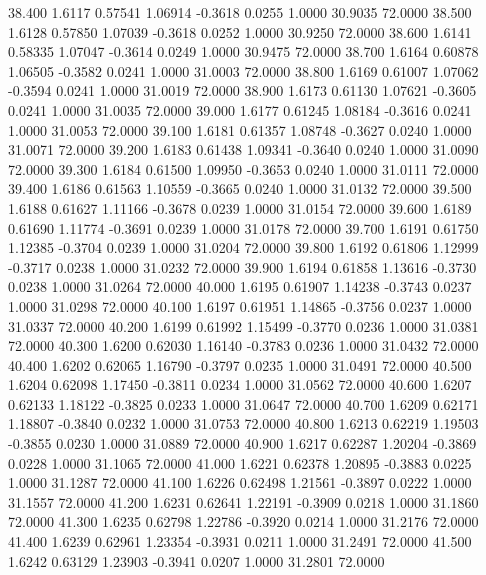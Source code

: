   38.400   1.6117   0.57541   1.06914  -0.3618   0.0255   1.0000  30.9035  72.0000
  38.500   1.6128   0.57850   1.07039  -0.3618   0.0252   1.0000  30.9250  72.0000
  38.600   1.6141   0.58335   1.07047  -0.3614   0.0249   1.0000  30.9475  72.0000
  38.700   1.6164   0.60878   1.06505  -0.3582   0.0241   1.0000  31.0003  72.0000
  38.800   1.6169   0.61007   1.07062  -0.3594   0.0241   1.0000  31.0019  72.0000
  38.900   1.6173   0.61130   1.07621  -0.3605   0.0241   1.0000  31.0035  72.0000
  39.000   1.6177   0.61245   1.08184  -0.3616   0.0241   1.0000  31.0053  72.0000
  39.100   1.6181   0.61357   1.08748  -0.3627   0.0240   1.0000  31.0071  72.0000
  39.200   1.6183   0.61438   1.09341  -0.3640   0.0240   1.0000  31.0090  72.0000
  39.300   1.6184   0.61500   1.09950  -0.3653   0.0240   1.0000  31.0111  72.0000
  39.400   1.6186   0.61563   1.10559  -0.3665   0.0240   1.0000  31.0132  72.0000
  39.500   1.6188   0.61627   1.11166  -0.3678   0.0239   1.0000  31.0154  72.0000
  39.600   1.6189   0.61690   1.11774  -0.3691   0.0239   1.0000  31.0178  72.0000
  39.700   1.6191   0.61750   1.12385  -0.3704   0.0239   1.0000  31.0204  72.0000
  39.800   1.6192   0.61806   1.12999  -0.3717   0.0238   1.0000  31.0232  72.0000
  39.900   1.6194   0.61858   1.13616  -0.3730   0.0238   1.0000  31.0264  72.0000
  40.000   1.6195   0.61907   1.14238  -0.3743   0.0237   1.0000  31.0298  72.0000
  40.100   1.6197   0.61951   1.14865  -0.3756   0.0237   1.0000  31.0337  72.0000
  40.200   1.6199   0.61992   1.15499  -0.3770   0.0236   1.0000  31.0381  72.0000
  40.300   1.6200   0.62030   1.16140  -0.3783   0.0236   1.0000  31.0432  72.0000
  40.400   1.6202   0.62065   1.16790  -0.3797   0.0235   1.0000  31.0491  72.0000
  40.500   1.6204   0.62098   1.17450  -0.3811   0.0234   1.0000  31.0562  72.0000
  40.600   1.6207   0.62133   1.18122  -0.3825   0.0233   1.0000  31.0647  72.0000
  40.700   1.6209   0.62171   1.18807  -0.3840   0.0232   1.0000  31.0753  72.0000
  40.800   1.6213   0.62219   1.19503  -0.3855   0.0230   1.0000  31.0889  72.0000
  40.900   1.6217   0.62287   1.20204  -0.3869   0.0228   1.0000  31.1065  72.0000
  41.000   1.6221   0.62378   1.20895  -0.3883   0.0225   1.0000  31.1287  72.0000
  41.100   1.6226   0.62498   1.21561  -0.3897   0.0222   1.0000  31.1557  72.0000
  41.200   1.6231   0.62641   1.22191  -0.3909   0.0218   1.0000  31.1860  72.0000
  41.300   1.6235   0.62798   1.22786  -0.3920   0.0214   1.0000  31.2176  72.0000
  41.400   1.6239   0.62961   1.23354  -0.3931   0.0211   1.0000  31.2491  72.0000
  41.500   1.6242   0.63129   1.23903  -0.3941   0.0207   1.0000  31.2801  72.0000
